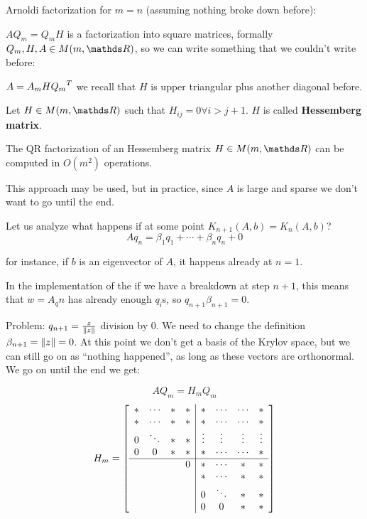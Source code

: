 \documentclass[ComputationalMathematics.tex]{subfiles}
\begin{document}
Arnoldi factorization for $m=n$ (assuming nothing broke down before):

$AQ_m = Q_m H$ is a factorization into square matrices, formally $Q_m, H, A \in M(m, \R)$, so we can write something that we couldn't write before:

$A = A_m H {Q_m}^{T}$ we recall that $H$ is upper triangular plus another diagonal before.

\begin{definition}
  Let $H \in M(m, \R)$ such that $H_{ij} = 0 \forall i > j+1$. $H$ is called \textbf{Hessemberg matrix}.
\end{definition}

\begin{proposition}
  The QR factorization of an Hessemberg matrix $H \in M(m, \R)$ can be computed in $O(m^2)$ operations.
\end{proposition}


This approach may be used, but in practice, since $A$ is large and sparse we don't want to go until the end.

Let us analyze what happens if at some point $K_{n+1}(A, b) = K_{n}(A, b)$?
\[
Aq_n = \beta_1 q_1 + \cdots + \beta_n q_n + 0
\]

for instance, if $b$ is an eigenvector of $A$, it happens already at $n=1$.


In the implementation of the  if we have a breakdown at step $n+1$, this means that $w = A_q n$ has already enough $q_i$s, so $q_{n+1} \beta_{n+1} = 0$.

Problem: $q_{n+1} = \frac{z}{\left\lVert z\right\rVert}$ division by $0$. We need to change the definition $\beta_{n+1} = \left\lVert z\right\rVert = 0$. At this point we don't get a basis of the Krylov space, but we can still go on as ``nothing happened'', as long as these vectors are orthonormal. We go on until the end we get:

\[
A Q_m = H_m Q_m
\]
\[
H_m = \left[
\begin{array}{cccc|ccccc}
\ast & \cdots & \ast & \ast & \ast & \cdots & \cdots & \ast\\
\ast & \cdots & \ast & \ast & \ast & \cdots & \cdots & \ast\\
0 & \ddots & \ast & \ast  & \vdots & \vdots & \vdots & \vdots\\
0 & 0 & \ast & \ast & \ast & \cdots & \cdots & \ast\\
\hline
&&& 0 & \ast & \cdots & \ast & \ast\\
&&&& \ast & \cdots & \ast & \ast\\
&&&& 0 & \ddots & \ast & \ast \\
&&&& 0 & 0 & \ast & \ast\\
\end{array}
\right]
\]
\end{document}
